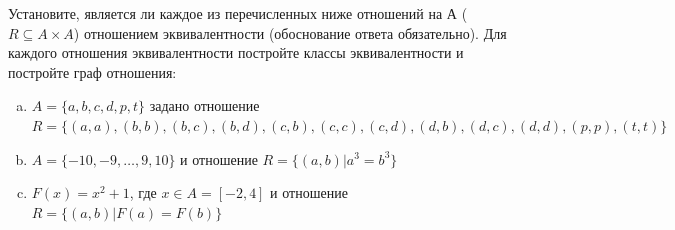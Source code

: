 \question
Установите, является ли каждое из перечисленных ниже отношений на А ($R \subseteq A \times A$) отношением эквивалентности (обоснование ответа обязательно). Для каждого отношения эквивалентности постройте классы 
эквивалентности и постройте граф отношения:
\begin{enumerate} [a)]\setcounter{enumi}{0}
\item $A = \{a, b, c, d, p, t\}$ задано отношение $R = \{(a, a), (b, b), (b, c), (b, d), (c, b), (c, c), (c, d), (d, b), (d, c), (d, d), (p,p), (t,t)\}$
\item $A = \{-10, -9, … , 9, 10\}$ и отношение $R = \{(a,b)|a^{3} = b^{3}\}$

\item $F(x)=x^{2}+1$, где $x \in A = [-2, 4]$ и отношение $R = \{(a,b)|F(a) = F(b)\}$
\end{enumerate}